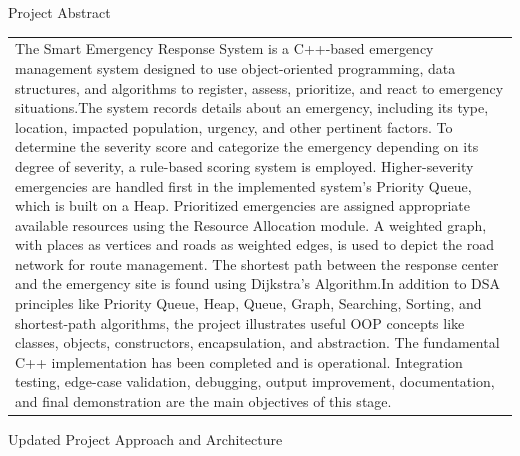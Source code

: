 \documentclass[12pt,a4paper]{article}
\newcommand{\sectiontitle}[1]{%
    {\color{GEUBlue}
    \fontsize{18}{22}\selectfont #1}
}
\newcommand{\instruction}[1]{%
    {\color{InstructionGrey}
    \fontsize{10.5}{13}\selectfont #1}
}
\newcommand{\answerbox}[2]{%
    \begin{tabularx}{\textwidth}{
        |>{\raggedright\arraybackslash}X|}
        \hline
        \parbox[t][#1][t]{\dimexpr\linewidth-12pt\relax}{
            \vspace{5pt}
            \fontsize{11}{13}\selectfont #2
        }\\
        \hline
    \end{tabularx}
}
\begin{document}
\vspace{0.70cm}

\sectiontitle{Project Abstract}

\vspace{0.05cm}

\instruction{}

\vspace{0.12cm}

\answerbox{6.80cm}{The Smart Emergency Response System is a C++-based emergency management system designed to use object-oriented programming, data structures, and algorithms to register, assess, prioritize, and react to emergency situations.The system records details about an emergency, including its type, location, impacted population, urgency, and other pertinent factors. To determine the severity score and categorize the emergency depending on its degree of severity, a rule-based scoring system is employed. Higher-severity emergencies are handled first in the implemented system's Priority Queue, which is built on a Heap. Prioritized emergencies are assigned appropriate available resources using the Resource Allocation module. A weighted graph, with places as vertices and roads as weighted edges, is used to depict the road network for route management. The shortest path between the response center and the emergency site is found using Dijkstra's Algorithm.In addition to DSA principles like Priority Queue, Heap, Queue, Graph, Searching, Sorting, and shortest-path algorithms, the project illustrates useful OOP concepts like classes, objects, constructors, encapsulation, and abstraction.
The fundamental C++ implementation has been completed and is operational. Integration testing, edge-case validation, debugging, output improvement, documentation, and final demonstration are the main objectives of this stage.}

\vspace{0.55cm}

\sectiontitle{Updated Project Approach and Architecture }

\vspace{0.05cm}

\instruction{}

\vspace{0.20cm}
\end{document}

